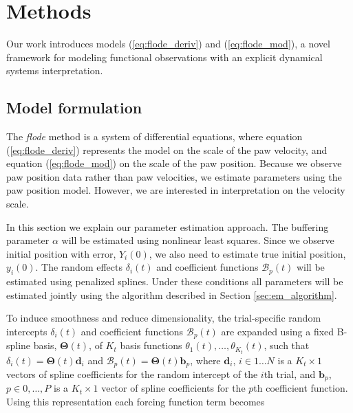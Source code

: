 \documentclass[preprint]{JASA}
\begin{document}
\hypertarget{methods}{%
\section{Methods}\label{methods}}

\label{sec:methods}

Our work introduces models (\ref{eq:flode_deriv}) and
(\ref{eq:flode_mod}), a novel framework for modeling functional
observations with an explicit dynamical systems interpretation.

\hypertarget{model-formulation}{%
\subsection{Model formulation}\label{model-formulation}}

The \emph{flode} method is a system of differential equations, where
equation (\ref{eq:flode_deriv}) represents the model on the scale of the
paw velocity, and equation (\ref{eq:flode_mod}) on the scale of the paw
position. Because we observe paw position data rather than paw
velocities, we estimate parameters using the paw position model.
However, we are interested in interpretation on the velocity scale.

In this section we explain our parameter estimation approach. The
buffering parameter \(\alpha\) will be estimated using nonlinear least
squares. Since we observe initial position with error, \(Y_i(0)\), we
also need to estimate true initial position, \(y_i(0)\). The random
effects \(\delta_i(t)\) and coefficient functions \(\mathcal{B}_p(t)\)
will be estimated using penalized splines. Under these conditions all
parameters will be estimated jointly using the algorithm described in
Section \ref{sec:em_algorithm}.

To induce smoothness and reduce dimensionality, the trial-specific
random intercepts \(\delta_i(t)\) and coefficient functions
\(\mathcal{B}_p(t)\) are expanded using a fixed B-spline basis,
\(\mathbf{\Theta}(t)\), of \(K_t\) basis functions
\(\theta_1(t),\ldots , \theta_{K_t}(t)\), such that
\(\delta_i(t) = \mathbf{\Theta}(t)\mathbf{d}_i\) and
\(\mathcal{B}_p(t) = \mathbf{\Theta}(t)\mathbf{b}_p\), where
\(\mathbf{d}_i\), \(i \in 1\ldots N\) is a \(K_t \times 1\) vectors of
spline coefficients for the random intercept of the \(i\)th trial, and
\(\mathbf{b}_p\), \(p \in 0, \ldots, P\) is a \(K_t \times 1\) vector of
spline coefficients for the \(p\)th coefficient function. Using this
representation each forcing function term becomes
\end{document}
